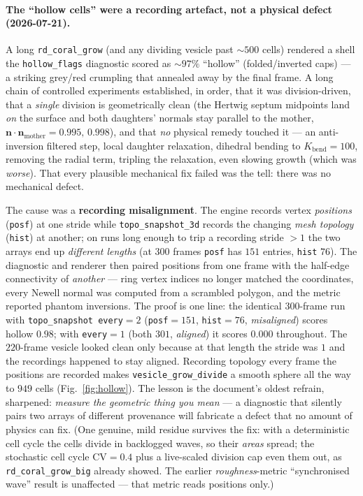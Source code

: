 \documentclass[11pt]{article}
\begin{document}
\paragraph{The ``hollow cells'' were a recording artefact, not a physical defect (2026-07-21).} A long
\texttt{rd\_coral\_grow} (and any dividing vesicle past $\sim\!500$ cells) rendered a shell the
\texttt{hollow\_flags} diagnostic scored as $\sim\!97\%$ ``hollow'' (folded/inverted caps) --- a striking
grey/red crumpling that annealed away by the final frame. A long chain of controlled experiments
established, in order, that it was division-driven, that a \emph{single} division is geometrically clean
(the Hertwig septum midpoints land \emph{on} the surface and both daughters' normals stay parallel to the
mother, $\mathbf{n}\!\cdot\!\mathbf{n}_{\text{mother}}=0.995,\,0.998$), and that \emph{no} physical remedy
touched it --- an anti-inversion filtered step, local daughter relaxation, dihedral bending to
$K_{\text{bend}}=100$, removing the radial term, tripling the relaxation, even slowing growth (which was
\emph{worse}). That every plausible mechanical fix failed was the tell: there was no mechanical defect.

The cause was a \textbf{recording misalignment}. The engine records vertex \emph{positions}
(\texttt{posf}) at one stride while \texttt{topo\_snapshot\_3d} records the changing \emph{mesh topology}
(\texttt{hist}) at another; on runs long enough to trip a recording stride $>1$ the two arrays end up
\emph{different lengths} (at $300$ frames \texttt{posf} has $151$ entries, \texttt{hist} $76$). The
diagnostic and renderer then paired positions from one frame with the half-edge connectivity of
\emph{another} --- ring vertex indices no longer matched the coordinates, every Newell normal was computed
from a scrambled polygon, and the metric reported phantom inversions. The proof is one line: the identical
$300$-frame run with \texttt{topo\_snapshot every}$=2$ (\texttt{posf}$=151$, \texttt{hist}$=76$,
\emph{misaligned}) scores hollow $0.98$; with \texttt{every}$=1$ (both $301$, \emph{aligned}) it scores
$\mathbf{0.000}$ throughout. The $220$-frame vesicle looked clean only because at that length the stride was
$1$ and the recordings happened to stay aligned. Recording topology every frame the positions are recorded
makes \texttt{vesicle\_grow\_divide} a smooth sphere all the way to $949$ cells (Fig.~\ref{fig:hollow}).
The lesson is the document's oldest refrain, sharpened: \emph{measure the geometric thing you mean} --- a
diagnostic that silently pairs two arrays of different provenance will fabricate a defect that no amount of
physics can fix. (One genuine, mild residue survives the fix: with a deterministic cell cycle the cells
divide in backlogged waves, so their \emph{areas} spread; the stochastic cell cycle CV$=0.4$ plus a
live-scaled division cap even them out, as \texttt{rd\_coral\_grow\_big} already showed. The earlier
\emph{roughness}-metric ``synchronised wave'' result is unaffected --- that metric reads positions only.)
\end{document}
